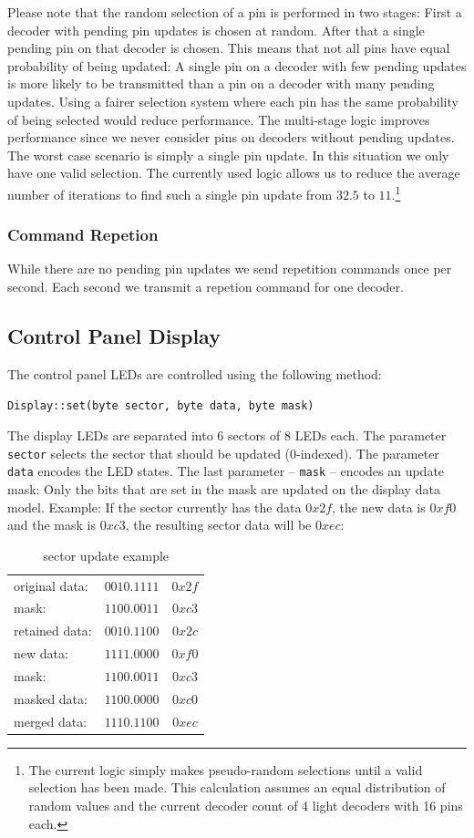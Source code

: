 \documentclass{scrreprt}
\newcommand{\code}[1]{\texttt{#1}}
\begin{document}
Please note that the random selection of a pin is performed in two stages:
First a decoder with pending pin updates is chosen at random.
After that a single pending pin on that decoder is chosen.
This means that not all pins have equal probability of being updated:
A single pin on a decoder with few pending updates is more likely to be transmitted than a pin on a decoder with many pending updates.
Using a fairer selection system where each pin has the same probability of being selected would reduce performance.
The multi-stage logic improves performance since we never consider pins on decoders without pending updates.
The worst case scenario is simply a single pin update.
In this situation we only have one valid selection.
The currently used logic allows us to reduce the average number of iterations to find such a single pin update from $32.5$ to $11$.\footnote{The current logic simply makes pseudo-random selections until a valid selection has been made. This calculation assumes an equal distribution of random values and the current decoder count of 4 light decoders with 16 pins each.}

\subsubsection{Command Repetion}
While there are no pending pin updates we send repetition commands once per second.
Each second we transmit a repetion command for one decoder.

\newpage
\subsection{Control Panel Display}
The control panel LEDs are controlled using the following method:

\code{Display::set(byte sector, byte data, byte mask)}

The display LEDs are separated into 6 sectors of 8 LEDs each.
The parameter \code{sector} selects the sector that should be updated (0-indexed).
The parameter \code{data} encodes the LED states.
The last parameter -- \code{mask} -- encodes an update mask:
Only the bits that are set in the mask are updated on the display data model.
Example:
If the sector currently has the data $0x2f$, the new data is $0xf0$ and the mask is $0xc3$, the resulting sector data will be $0xec$:

\begin{table}[ht!]
\centering
\begin{tabular}{ | l | c | c |}
\hline
original data: 	& $0010.1111$ & $0x2f$ \\
mask:				& $1100.0011$ & $0xc3$ \\\hline
retained data:  & $0010.1100$ & $0x2c$ \\\hline\hline
new data: 		& $1111.0000$ & $0xf0$ \\
mask:				& $1100.0011$ & $0xc3$ \\\hline
masked data:		& $1100.0000$ & $0xc0$ \\\hline\hline
merged data:    & $1110.1100$ & $0xec$ \\\hline
\end{tabular}
\caption{sector update example}
\end{table}
\end{document}
